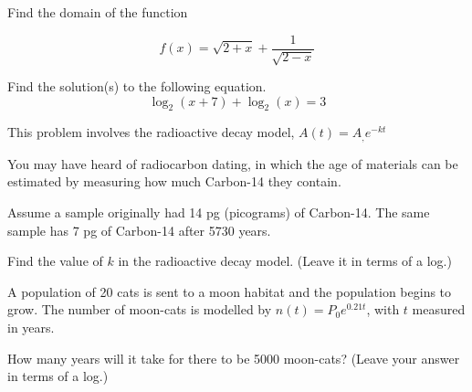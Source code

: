 \begin{questions}
\newpage

\question[6] %
Find the domain of the function 

\begin{equation*}
    f(x) = \sqrt{2+x} + \dfrac{1}{\sqrt{2-x}}
\end{equation*}
\vspace{8cm}

\question[6]
Find the solution(s) to the following equation.
\[
\log_2(x+7)+\log_2(x)=3
\]


\newpage
\question[5] %
This problem involves the radioactive decay model, $A(t)=A_, e^{-kt}$

You may have heard of radiocarbon dating, in which the age of materials can be estimated by measuring how much Carbon-14 they contain.  

Assume a sample originally had 14 pg (picograms) of Carbon-14. The same sample has 7 pg of Carbon-14 after 5730 years.

    Find the value of $k$ in the radioactive decay model. (Leave it in terms of a log.)%

    \vspace{.35\textheight}
    
    \question[5] A population of 20 cats is sent to a  moon habitat and the population begins to grow. The number of moon-cats is modelled by $n(t)=P_0 e^{0.21t}$, with $t$ measured in years.

    How many years will it take for there to be 5000 moon-cats?
    (Leave your answer in terms of a log.)

\end{questions}